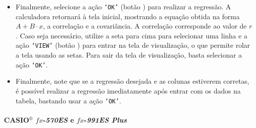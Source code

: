 \begin{itemize}
\item Finalmente, selecione a ação \texttt{`OK'} (botão ) para realizar a regressão. A calculadora retornará à tela inicial, mostrando a equação obtida na forma $A + B \cdot x$, a correlação e a covariância. A correlação corresponde ao valor de $r$. Caso seja necessário, utilize a seta para cima para selecionar uma linha e a ação \texttt{`VIEW'} (botão ) para entrar na tela de visualização, o que permite rolar a tela usando as setas. Para sair da tela de visualização, basta selecionar a ação \texttt{`OK'}.

\item Finalmente, note que se a regressão desejada e as colunas estiverem corretas, é possível realizar a regressão imediatamente após entrar com os dados na tabela, bastando usar a ação \texttt{`OK'}.
\end{itemize}

\paragraph{CASIO$^{\circledR}$ $fx$-\textit{570ES} e $fx$-\textit{991ES Plus}}

